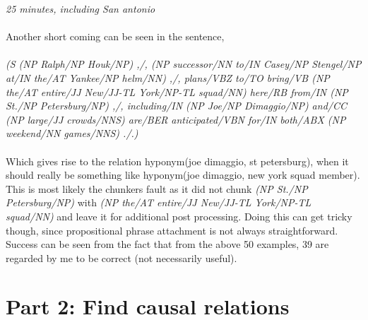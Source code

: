\documentclass[11pt]{article}
\begin{document}
\textit{25 minutes, including San antonio}\\ \\ \normalsize
Another short coming can be seen in the sentence,\\ \\ \small
\textit{(S  (NP Ralph/NP Houk/NP)  ,/,  (NP    successor/NN    to/IN    Casey/NP    Stengel/NP    at/IN    the/AT    Yankee/NP    helm/NN)  ,/,  plans/VBZ  to/TO  bring/VB  (NP the/AT entire/JJ New/JJ-TL York/NP-TL squad/NN)  here/RB  from/IN  (NP St./NP Petersburg/NP)  ,/,  including/IN  (NP Joe/NP Dimaggio/NP)  and/CC  (NP large/JJ crowds/NNS)  are/BER  anticipated/VBN  for/IN  both/ABX  (NP weekend/NN games/NNS)  ./.) }\\ \\ \normalsize
Which gives rise to the relation hyponym(joe dimaggio, st petersburg), when it should really be something like hyponym(joe dimaggio, new york squad member). This is most likely the chunkers fault as it did not chunk \textit{(NP St./NP Petersburg/NP)} with \textit{(NP the/AT entire/JJ New/JJ-TL York/NP-TL squad/NN)} and leave it for additional post processing. Doing this can get tricky though, since propositional phrase attachment is not always straightforward.\\
Success can be seen from the fact that from the above 50 examples, 39 are regarded by me to be correct (not necessarily useful).\\




\section{Part 2: Find causal relations}
\end{document}
